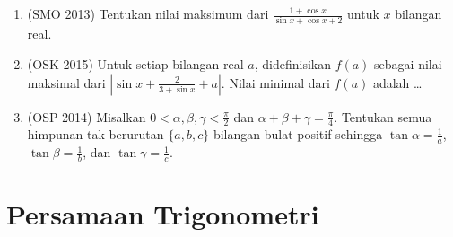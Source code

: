 \documentclass[12pt]{scrartcl}
\begin{document}
\begin{enumerate}
	\item (SMO 2013)
	Tentukan nilai maksimum dari $\frac{1+\cos x}{\sin x+\cos x+2}$
	untuk $x$ bilangan real.

	\item (OSK 2015)
	Untuk setiap bilangan real $a$, didefinisikan $f(a)$ sebagai nilai maksimal
	dari $\left|\sin x+\frac{2}{3+\sin x}+a\right|$.
	Nilai minimal dari $f(a)$ adalah \dots

	\item (OSP 2014)
	Misalkan $0 < \alpha, \beta, \gamma < \frac{\pi}{2}$ dan
	$\alpha+\beta+\gamma = \frac{\pi}{4}$. Tentukan semua himpunan tak berurutan
	$\{a, b, c\}$ bilangan bulat positif sehingga $\tan\alpha = \frac1a$,
	$\tan\beta = \frac1b$, dan $\tan\gamma = \frac1c$.

\end{enumerate}

\section{Persamaan Trigonometri}
\end{document}

